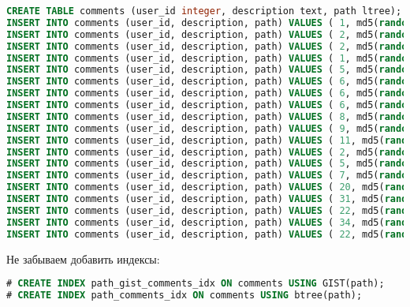 \begin{lstlisting}[language=SQL,label=lst:pgltree2,caption=Ltree]
CREATE TABLE comments (user_id integer, description text, path ltree);
INSERT INTO comments (user_id, description, path) VALUES ( 1, md5(random()::text), '0001');
INSERT INTO comments (user_id, description, path) VALUES ( 2, md5(random()::text), '0001.0001.0001');
INSERT INTO comments (user_id, description, path) VALUES ( 2, md5(random()::text), '0001.0001.0001.0001');
INSERT INTO comments (user_id, description, path) VALUES ( 1, md5(random()::text), '0001.0001.0001.0002');
INSERT INTO comments (user_id, description, path) VALUES ( 5, md5(random()::text), '0001.0001.0001.0003');
INSERT INTO comments (user_id, description, path) VALUES ( 6, md5(random()::text), '0001.0002');
INSERT INTO comments (user_id, description, path) VALUES ( 6, md5(random()::text), '0001.0002.0001');
INSERT INTO comments (user_id, description, path) VALUES ( 6, md5(random()::text), '0001.0003');
INSERT INTO comments (user_id, description, path) VALUES ( 8, md5(random()::text), '0001.0003.0001');
INSERT INTO comments (user_id, description, path) VALUES ( 9, md5(random()::text), '0001.0003.0002');
INSERT INTO comments (user_id, description, path) VALUES ( 11, md5(random()::text), '0001.0003.0002.0001');
INSERT INTO comments (user_id, description, path) VALUES ( 2, md5(random()::text), '0001.0003.0002.0002');
INSERT INTO comments (user_id, description, path) VALUES ( 5, md5(random()::text), '0001.0003.0002.0003');
INSERT INTO comments (user_id, description, path) VALUES ( 7, md5(random()::text), '0001.0003.0002.0002.0001');
INSERT INTO comments (user_id, description, path) VALUES ( 20, md5(random()::text), '0001.0003.0002.0002.0002');
INSERT INTO comments (user_id, description, path) VALUES ( 31, md5(random()::text), '0001.0003.0002.0002.0003');
INSERT INTO comments (user_id, description, path) VALUES ( 22, md5(random()::text), '0001.0003.0002.0002.0004');
INSERT INTO comments (user_id, description, path) VALUES ( 34, md5(random()::text), '0001.0003.0002.0002.0005');
INSERT INTO comments (user_id, description, path) VALUES ( 22, md5(random()::text), '0001.0003.0002.0002.0006');
\end{lstlisting}

Не забываем добавить индексы:

\begin{lstlisting}[language=SQL,label=lst:pgltree3,caption=Ltree]
# CREATE INDEX path_gist_comments_idx ON comments USING GIST(path);
# CREATE INDEX path_comments_idx ON comments USING btree(path);
\end{lstlisting}

